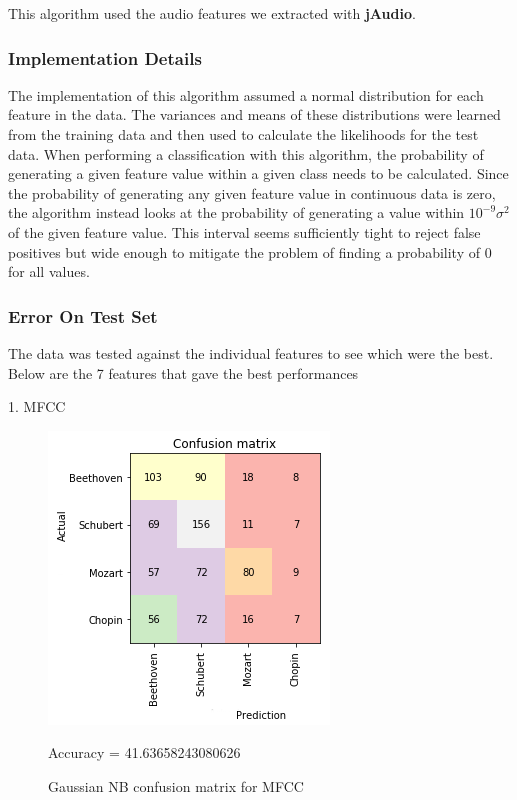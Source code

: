\documentclass[11pt]{article}
\makeatletter
\def\maxwidth{\ifdim\Gin@nat@width>\linewidth\linewidth
    \else\Gin@nat@width\fi}
\let\Oldincludegraphics\includegraphics
\renewcommand{\includegraphics}[1]{\Oldincludegraphics[width=.8\maxwidth]{#1}}
\makeatother
\begin{document}
This algorithm used the audio features we extracted with
\textbf{jAudio}.

\subsubsection{Implementation Details}\label{implementation-details}

The implementation of this algorithm assumed a normal distribution for
each feature in the data. The variances and means of these distributions
were learned from the training data and then used to calculate the
likelihoods for the test data. When performing a classification with
this algorithm, the probability of generating a given feature value
within a given class needs to be calculated. Since the probability of
generating any given feature value in continuous data is zero, the
algorithm instead looks at the probability of generating a value within
\(10^{-9} \sigma^2\) of the given feature value. This interval seems
sufficiently tight to reject false positives but wide enough to mitigate
the problem of finding a probability of 0 for all values.

\subsubsection{Error On Test Set}\label{error-on-test-set}

The data was tested against the individual features to see which were
the best. Below are the 7 features that gave the best performances

1. MFCC

\begin{figure}[h!]
\includegraphics{report/plots/MFCC.png}
\caption{Gaussian NB confusion matrix for MFCC}
Accuracy = 41.63658243080626
\end{figure}
\end{document}
